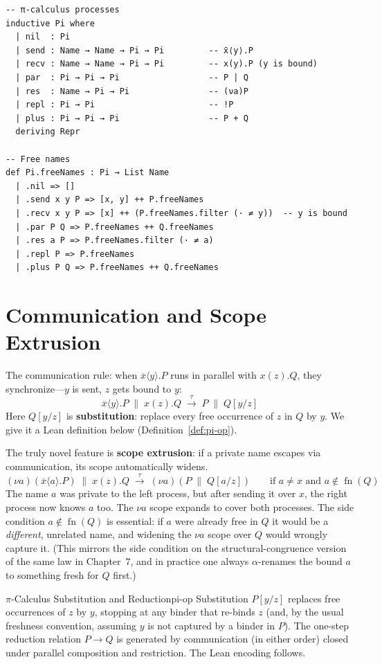 \documentclass[11pt, a4paper, oneside]{book}
\newcommand{\Par}{\mathbin{\|}}
\newcommand{\res}[1]{(\nu #1)}
\newcommand{\inp}[2]{#1(#2)}
\newcommand{\outp}[2]{\overline{#1}\langle #2 \rangle}
\newcommand{\reduces}{\longrightarrow}
\newcommand{\fn}{\operatorname{fn}}
\begin{document}
\begin{leanbox}
\begin{verbatim}
-- π-calculus processes
inductive Pi where
  | nil  : Pi
  | send : Name → Name → Pi → Pi         -- x̄⟨y⟩.P
  | recv : Name → Name → Pi → Pi         -- x(y).P (y is bound)
  | par  : Pi → Pi → Pi                  -- P | Q
  | res  : Name → Pi → Pi                -- (νa)P
  | repl : Pi → Pi                       -- !P
  | plus : Pi → Pi → Pi                  -- P + Q
  deriving Repr

-- Free names
def Pi.freeNames : Pi → List Name
  | .nil => []
  | .send x y P => [x, y] ++ P.freeNames
  | .recv x y P => [x] ++ (P.freeNames.filter (· ≠ y))  -- y is bound
  | .par P Q => P.freeNames ++ Q.freeNames
  | .res a P => P.freeNames.filter (· ≠ a)
  | .repl P => P.freeNames
  | .plus P Q => P.freeNames ++ Q.freeNames
\end{verbatim}
\end{leanbox}

\section{Communication and Scope Extrusion}

The communication rule: when $\outp{x}{y}.P$ runs in parallel with
$\inp{x}{z}.Q$, they synchronize---$y$ is sent, $z$ gets bound to $y$:
\[
  \outp{x}{y}.P \;\Par\; \inp{x}{z}.Q \;\xrightarrow{\tau}\;
  P \;\Par\; Q[y/z]
\]
Here $Q[y/z]$ is \textbf{substitution}: replace every free occurrence of $z$
in $Q$ by $y$. We give it a Lean definition below (Definition~\ref{def:pi-op}).

The truly novel feature is \textbf{scope extrusion}: if a private name
escapes via communication, its scope automatically widens.
\[
  \res{a}(\outp{x}{a}.P) \;\Par\; \inp{x}{z}.Q
  \;\xrightarrow{\tau}\;
  \res{a}(P \;\Par\; Q[a/z])
  \qquad\text{if } a \neq x \text{ and } a \notin \fn(Q)
\]
The name $a$ was private to the left process, but after sending it over $x$,
the right process now knows $a$ too. The $\nu a$ scope expands to cover
both processes. The side condition $a \notin \fn(Q)$ is essential: if $a$ were
already free in $Q$ it would be a \emph{different}, unrelated name, and
widening the $\nu a$ scope over $Q$ would wrongly capture it. (This mirrors
the side condition on the structural-congruence version of the same law in
Chapter~7, and in practice one always $\alpha$-renames the bound $a$ to
something fresh for $Q$ first.)

\begin{defn}{$\pi$-Calculus Substitution and Reduction}{pi-op}
Substitution $P[y/z]$ replaces free occurrences of $z$ by $y$, stopping at any
binder that re-binds $z$ (and, by the usual freshness convention, assuming $y$
is not captured by a binder in $P$). The one-step reduction relation
$P \reduces Q$ is generated by communication (in either order) closed under
parallel composition and restriction. The Lean encoding follows.
\end{defn}
\end{document}
